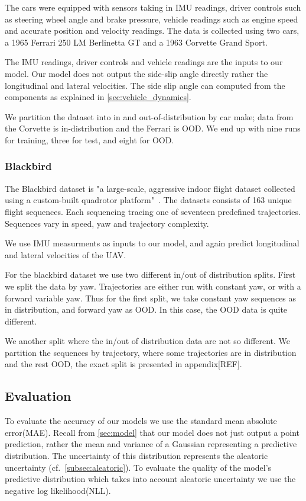 \documentclass[../main.tex]{subfiles}
\begin{document}
The cars were equipped with sensors taking in IMU readings, driver controls such as steering wheel angle and brake pressure, vehicle readings such as engine speed and accurate position and velocity readings. The data is collected using two cars, a 1965 Ferrari 250 LM Berlinetta GT and a 1963 Corvette Grand Sport. 

The IMU readings, driver controls and vehicle readings are the inputs to our model.
Our model does not output the side-slip angle directly rather the longitudinal and lateral velocities. The side slip angle can computed from the components as explained in \cref{sec:vehicle_dynamics}.

We partition the dataset into in and out-of-distribution by car make; data from the Corvette is in-distribution and the Ferrari is OOD. We end up with nine runs for training, three for test, and eight for OOD. 

\subsubsection{Blackbird}

The Blackbird dataset is "a large-scale, aggressive indoor flight dataset collected using a custom-built quadrotor platform"~\citep{antonini2018blackbird}. The datasets consists of 163 unique flight sequences. Each sequencing tracing one of seventeen predefined trajectories. Sequences vary in speed, yaw and trajectory complexity. 

We use IMU measurments as inputs to our model, and again predict longitudinal and lateral velocities of the UAV. 

For the blackbird dataset we use two different in/out of distribution splits. First we split the data by yaw. Trajectories are either run with constant yaw, or with a forward variable yaw. Thus for the first split, we take constant yaw sequences as in distribution, and forward yaw as OOD. In this case, the OOD data is quite different.

We another split where the in/out of distribution data are not so different. We partition the sequences by trajectory, where some trajectories are in distribution and the rest OOD, the exact split is presented in appendix[REF]. 

\subsection{Evaluation}

To evaluate the accuracy of our models we use the standard mean absolute error(MAE). Recall from \cref{sec:model} that our model does not just output a point prediction, rather the mean and variance of a Gaussian representing a predictive distribution. The uncertainty of this distribution represents the aleatoric uncertainty (cf.\ \ref{subsec:aleatoric}). 
To evaluate the quality of the model's predictive distribution which takes into account aleatoric uncertainty we use the negative log likelihood(NLL). 
\end{document}
